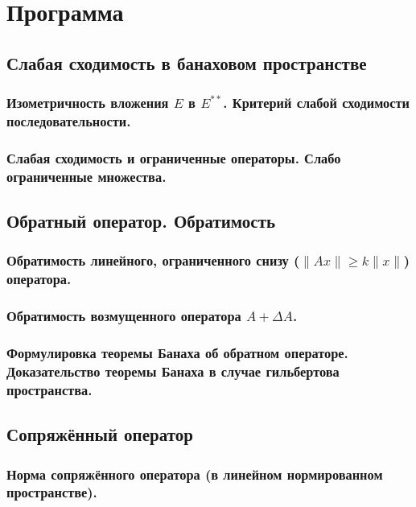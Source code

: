 \newpage
\chapter{Программа}

\section{Слабая сходимость в банаховом пространстве}
\subsection{Изометричность вложения $E$ в $E^{**}$. Критерий слабой сходимости последовательности.}



\subsection{Слабая сходимость и ограниченные операторы. Слабо ограниченные множества.}



\section{Обратный оператор. Обратимость}
\subsection{Обратимость линейного, ограниченного снизу ($\|Ax\| \geqslant k \|x\|$) оператора.}


\subsection{Обратимость возмущенного оператора $A + \Delta A$.}


\subsection{Формулировка теоремы Банаха об обратном операторе. Доказательство теоремы Банаха в случае гильбертова пространства.}


\section{Сопряжённый оператор}
\label{conjugate-op-section}
\subsection{Норма сопряжённого оператора (в линейном нормированном пространстве).}


